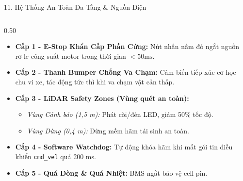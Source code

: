 \documentclass[aspectratio=169,9pt]{beamer}
\newcommand{\smallnote}[1]{{\fontsize{7.1}{8.4}\selectfont #1\par}}
\newcommand{\tinytext}[1]{{\fontsize{6.3}{7.3}\selectfont #1\par}}
\newcommand{\tightitems}{\setlength{\itemsep}{0.13em}\setlength{\parskip}{0pt}\setlength{\parsep}{0pt}}
\newcommand{\verytightitems}{\setlength{\itemsep}{0.04em}\setlength{\parskip}{0pt}\setlength{\parsep}{0pt}}
\begin{document}
\begin{frame}{11. Hệ Thống An Toàn Đa Tầng \& Nguồn Điện}
  \vspace{0.02cm}
  \begin{columns}[T,onlytextwidth]
    \begin{column}{0.50\textwidth}
      \begin{tcolorbox}[titlepanel,title=Kiến trúc an toàn 5 cấp (Tiêu chuẩn ISO 3691-4)]
        \begin{itemize}\tightitems
          \item \smallnote{\textbf{Cấp 1 - E-Stop Khẩn Cấp Phần Cứng:} Nút nhấn nấm đỏ ngắt nguồn rơ-le công suất motor trong thời gian $< 50\text{ms}$.}
          \item \smallnote{\textbf{Cấp 2 - Thanh Bumper Chống Va Chạm:} Cảm biến tiếp xúc cơ học chu vi xe, tác động tức thì khi va chạm vật cản thấp.}
          \item \smallnote{\textbf{Cấp 3 - LiDAR Safety Zones (Vùng quét an toàn):}
            \begin{itemize}\verytightitems
              \item \tinytext{\textit{Vùng Cảnh báo (1,5 m):} Phát còi/đèn LED, giảm 50\% tốc độ.}
              \item \tinytext{\textit{Vùng Dừng (0,4 m):} Dừng mềm hãm tái sinh an toàn.}
            \end{itemize}}
          \item \smallnote{\textbf{Cấp 4 - Software Watchdog:} Tự động khóa hãm khi mất gói tin điều khiển \texttt{cmd\_vel} quá 200 ms.}
          \item \smallnote{\textbf{Cấp 5 - Quá Dòng \& Quá Nhiệt:} BMS ngắt bảo vệ cell pin.}
        \end{itemize}
      \end{tcolorbox}
    \end{column}


\end{columns}
\end{frame}
\end{document}
